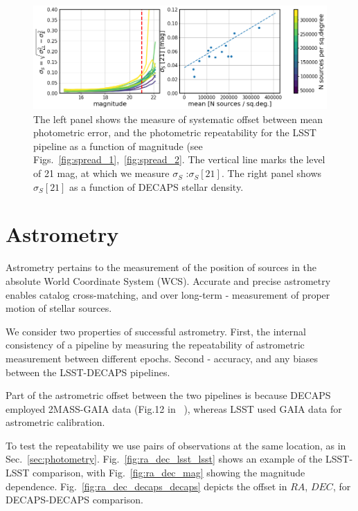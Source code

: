 \documentclass[DM,lsstdraft,toc,usenatbib]{lsstdoc}
\begin{document}
\begin{figure}
\begin{centering}
\includegraphics[width=0.95\columnwidth]{figs/photometric_offset_combined.png}
\caption{The left panel shows the measure of systematic offset between mean photometric error, and the photometric repeatability for the LSST pipeline as a function of magnitude (see Figs.~\ref{fig:spread_1},~\ref{fig:spread_2}. The vertical line marks the level of 21 mag, at which we measure $\sigma_{S}$ :$\sigma_{S}[21]$. The right panel shows $\sigma_{S}[21]$  as a function of DECAPS stellar density.}
\label{fig:spread_summary}
\end{centering}
\end{figure} 



\section{Astrometry}
\label{sec:astrometry}
Astrometry pertains to the measurement of the position of sources in the absolute World Coordinate System (WCS). Accurate and precise astrometry enables catalog cross-matching, and over long-term - measurement of proper motion of stellar sources. 

We consider two properties of successful astrometry. First, the internal consistency of a pipeline by measuring the repeatability of astrometric measurement between different epochs.  Second - accuracy, and any biases between the LSST-DECAPS pipelines. 

Part of the astrometric offset between the two pipelines is because  DECAPS employed 2MASS-GAIA data (Fig.12 in ~\cite{schlafly2017}), whereas LSST used GAIA data for astrometric calibration. 

To test the repeatability we use pairs of observations at the same location, as in Sec.~\ref{sec:photometry}. Fig.~\ref{fig:ra_dec_lsst_lsst} shows an example of the LSST-LSST comparison, with Fig.~\ref{fig:ra_dec_mag} showing the magnitude dependence. Fig.~\ref{fig:ra_dec_decaps_decaps} depicts the offset in $RA$, $DEC$, for DECAPS-DECAPS comparison. 
\end{document}
